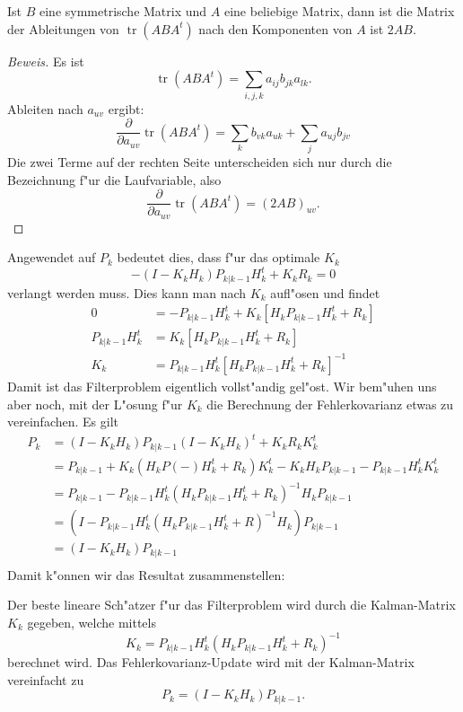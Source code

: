 \begin{hilfssatz}Ist $B$ eine symmetrische Matrix und $A$ eine beliebige
Matrix, dann ist die Matrix der Ableitungen von $\operatorname{tr}(ABA^t)$
nach den Komponenten von $A$  ist $2AB$.
\end{hilfssatz}

\begin{proof}[Beweis]
Es ist
\[
\operatorname{tr}(ABA^t)=\sum_{i,j,k}a_{ij}b_{jk}a_{lk}.
\]
Ableiten nach $a_{uv}$ ergibt:
\[
\frac{\partial}{\partial a_{uv}}\operatorname{tr}(ABA^t)
=\sum_{k}b_{vk}a_{uk}+\sum_{j}a_{uj}b_{jv}
\]
Die zwei Terme auf der rechten Seite unterscheiden sich nur durch
die Bezeichnung f"ur die Laufvariable, also
\[
\frac{\partial}{\partial a_{uv}}\operatorname{tr}(ABA^t)
=(2AB)_{uv}.
\]
\end{proof}

Angewendet auf $P_{k}$ bedeutet dies, dass f"ur das optimale $K_k$
\[
-(I-K_kH_{k})P_{k|k-1}H_{k}^t +K_kR_k=0
\]
verlangt werden muss.
Dies kann man nach $K_k$ aufl"osen und findet
\begin{align*}
0&=-P_{k|k-1}H_{k}^t +K_k[H_{k}P_{k|k-1}H_{k}^t +R_{k}]\\
P_{k|k-1}H_{k}^t&=K_k[H_{k}P_{k|k-1}H_{k}^t +R_{k}]\\
K_k&= P_{k|k-1}H_{k}^t [H_{k}P_{k|k-1}H_{k}^t +R_{k}]^{-1}
\end{align*}
Damit ist das Filterproblem eigentlich vollst"andig gel"ost. Wir bem"uhen uns
aber noch, mit der L"osung f"ur $K_k$ die Berechnung der Fehlerkovarianz etwas zu
vereinfachen.
Es gilt
\begin{align*}
P_{k}&=(I-K_{k}H_{k})P_{k|k-1}(I-K_{k}H_{k})^t+K_{k}R_kK_{k}^t\\
&=P_{k|k-1} + K_{k}(H_{k}P(-)H_{k}^t+R_k)K_{k}^t -K_{k}H_{k}P_{k|k-1}-P_{k|k-1}H_{k}^tK_{k}^t\\
&=P_{k|k-1} - P_{k|k-1}H_{k}^t(H_{k}P_{k|k-1}H_{k}^t+R_k)^{-1}H_{k}P_{k|k-1}\\
&=(I-P_{k|k-1}H_{k}^t(H_{k}P_{k|k-1}H_{k}^t + R)^{-1}H_{k})P_{k|k-1}\\
&=(I-K_{k}H_{k})P_{k|k-1}\\
\end{align*}
Damit k"onnen wir das Resultat zusammenstellen:
\begin{satz}
Der beste lineare Sch"atzer f"ur das Filterproblem wird durch die Kalman-Matrix
$K_k$ gegeben, welche mittels
\begin{equation}
K_k=P_{k|k-1}H_k^t(H_kP_{k|k-1}H_k^t+R_k)^{-1}
\label{kalman-gains}
\end{equation}
berechnet wird. Das Fehlerkovarianz-Update wird mit der Kalman-Matrix
vereinfacht zu
\[
P_k=(I-K_kH_k)P_{k|k-1}.
\]
\end{satz}

